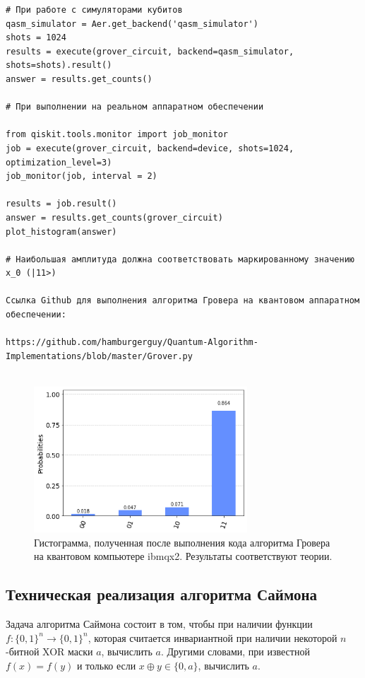 \documentclass{mrl}
\begin{document}
\begin{verbatim}
# При работе с симуляторами кубитов
qasm_simulator = Aer.get_backend('qasm_simulator')
shots = 1024
results = execute(grover_circuit, backend=qasm_simulator, shots=shots).result()
answer = results.get_counts()

# При выполнении на реальном аппаратном обеспечении

from qiskit.tools.monitor import job_monitor
job = execute(grover_circuit, backend=device, shots=1024, optimization_level=3)
job_monitor(job, interval = 2)

results = job.result()
answer = results.get_counts(grover_circuit)
plot_histogram(answer)

# Наибольшая амплитуда должна соответствовать маркированному значению x_0 (|11>)

Ссылка Github для выполнения алгоритма Гровера на квантовом аппаратном обеспечении:

https://github.com/hamburgerguy/Quantum-Algorithm-Implementations/blob/master/Grover.py


\end{verbatim}

\break 

\begin{figure}
    \centering
    \includegraphics[width=8cm]{grover11.png}
    \caption{Гистограмма, полученная после выполнения кода алгоритма Гровера на квантовом компьютере ibmqx2. Результаты соответствуют теории.}
    \label{fig:grovers_output}
\end{figure}

\subsection{Техническая реализация алгоритма Саймона}\label{appsec:simons}

Задача алгоритма Саймона состоит в том, чтобы при наличии функции $f : \{ 0, 1 \} ^n \to \{ 0, 1 \} ^n$, которая считается инвариантной при наличии некоторой $n$-битной XOR маски $a$, вычислить $a$. Другими словами, при известной $f(x) = f(y)$ и только если $x \oplus y  \in  \{ 0, a \}$, вычислить $a$.
\end{document}
